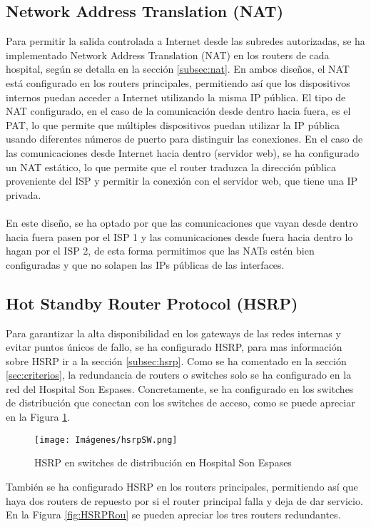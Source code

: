 \subsection{Network Address Translation (NAT)}
Para permitir la salida controlada a Internet desde las subredes autorizadas, se ha implementado Network Address Translation (NAT) en los routers de cada hospital, 
según se detalla en la sección \ref{subsec:nat}. En ambos diseños, el NAT está configurado en los routers principales, permitiendo así que los dispositivos internos puedan acceder a Internet utilizando la misma IP pública. El tipo de 
NAT configurado, en el caso de la comunicación desde dentro hacia fuera, es el PAT, lo que permite que múltiples dispositivos puedan utilizar la IP pública usando diferentes números de puerto para distinguir las conexiones. En el caso de las comunicaciones desde Internet hacia dentro (servidor web), se ha configurado un NAT estático, lo que permite que 
el router traduzca la dirección pública proveniente del ISP y permitir la conexión con el servidor web, que tiene una IP privada.
\\ \\
En este diseño, se ha optado por que las comunicaciones que vayan desde dentro hacia fuera pasen por el ISP 1 y las comunicaciones desde fuera hacia dentro lo hagan por el ISP 2, de esta forma 
permitimos que las NATs estén bien configuradas y que no solapen las IPs públicas de las interfaces.
\subsection{Hot Standby Router Protocol (HSRP)}
Para garantizar la alta disponibilidad en los gateways de las redes internas y evitar puntos únicos de fallo, se ha configurado HSRP, para mas información sobre HSRP ir a la sección \ref{subsec:hsrp}. 
Como se ha comentado en la sección \ref{sec:criterios}, la redundancia de routers o switches solo se ha configurado en la red del Hospital Son Espases. Concretamente, se ha configurado en los switches de distribución 
que conectan con los switches de acceso, como se puede apreciar en la Figura \ref{fig:HSRPSW}.

\begin{figure}[H]
    \centering
    \texttt{[image: Imágenes/hsrpSW.png]}
    \caption{HSRP en switches de distribución en Hospital Son Espases}
    \label{fig:HSRPSW}
\end{figure}

También se ha configurado HSRP en los routers principales, permitiendo así que haya dos routers de repuesto por si el router principal falla y deja de dar servicio. En la Figura \ref{fig:HSRPRou} 
se pueden apreciar los tres routers redundantes.

